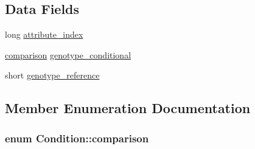 \subsection*{Data Fields}
\begin{DoxyCompactItemize}
\item 
long \hyperlink{classCondition_a081912e5b4f419de020299acbc8ee760}{attribute\_\-index}
\item 
\hyperlink{classCondition_af41afbd9545b1fb2e2cb4a4792d52408}{comparison} \hyperlink{classCondition_afe18e96245b5ebaa6bf8318ec9184d82}{genotype\_\-conditional}
\item 
short \hyperlink{classCondition_a11cbb60b2a8ee2446b10f0dc8858cfae}{genotype\_\-reference}
\end{DoxyCompactItemize}


\subsection{Member Enumeration Documentation}
\hypertarget{classCondition_af41afbd9545b1fb2e2cb4a4792d52408}{
\subsubsection[{comparison}]{\setlength{\rightskip}{0pt plus 5cm}enum {\bf Condition::comparison}}}
\label{classCondition_af41afbd9545b1fb2e2cb4a4792d52408}
